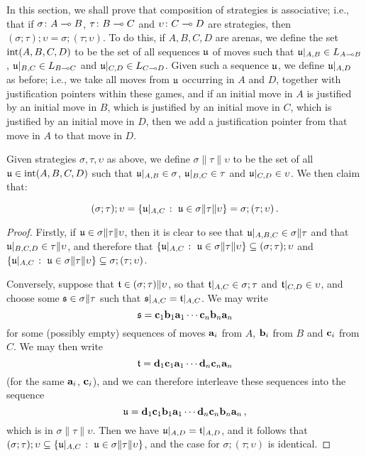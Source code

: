 \documentclass[11pt]{report}
\begin{document}
In this section, we shall prove that composition of strategies is associative; i.e., that if $\sigma\colon A \multimap B$, $\tau\colon B\multimap C$ and $\upsilon \colon C \multimap D$ are strategies, then $(\sigma;\tau);\upsilon=\sigma;(\tau;\upsilon)$.  
To do this, if $A,B,C,D$ are arenas, we define the set $\operatorname{int}(A,B,C,D)$ to be the set of all sequences $\mathfrak u$ of moves such that $\mathfrak u\vert_{A,B}\in L_{A\multimap B}$, $\mathfrak u\vert_{B,C}\in L_{B\multimap C}$ and $\mathfrak u\vert_{C,D}\in L_{C \multimap D}$.  
Given such a sequence $\mathfrak u$, we define $\mathfrak u\vert_{A,D}$ as before; i.e., we take all moves from $\mathfrak u$ occurring in $A$ and $D$, together with justification pointers within these games, and if an initial move in $A$ is justified by an initial move in $B$, which is justified by an initial move in $C$, which is justified by an initial move in $D$, then we add a justification pointer from that move in $A$ to that move in $D$.

Given strategies $\sigma,\tau,\upsilon$ as above, we define $\sigma\|\tau\|\upsilon$ to be the set of all $\mathfrak u\in\operatorname{int}(A,B,C,D)$ such that $\mathfrak u\vert_{A,B}\in\sigma$, $\mathfrak u\vert_{B,C}\in\tau$ and $\mathfrak u\vert_{C,D}\in\upsilon$.
We then claim that:

\begin{lemma}
  \[
    (\sigma;\tau);\upsilon = \{\mathfrak u\vert_{A,C}\;\colon\; \mathfrak u\in\sigma\|\tau\|\upsilon\} = \sigma;(\tau;\upsilon)\,.
    \]
\end{lemma}
\begin{proof}
  Firstly, if $\mathfrak u\in\sigma\|\tau\|\upsilon$, then it is clear to see that $\mathfrak u\vert_{A,B,C}\in\sigma\|\tau$ and that $\mathfrak u\vert_{B,C,D}\in\tau\|\upsilon$, and therefore that $\{\mathfrak u\vert_{A,C}\;\colon\; \mathfrak u\in\sigma\|\tau\|\upsilon\}\subseteq (\sigma;\tau);\upsilon$ and $\{\mathfrak u\vert_{A,C}\;\colon\; \mathfrak u\in\sigma\|\tau\|\upsilon\}\subseteq \sigma;(\tau;\upsilon)$. 

  Conversely, suppose that $\mathfrak t\in(\sigma;\tau)\|\upsilon$, so that $\mathfrak t\vert_{A,C}\in\sigma;\tau$ and $\mathfrak t\vert_{C,D}\in\upsilon$, and choose some $\mathfrak s\in\sigma\|\tau$ such that $\mathfrak s\vert_{A,C}=\mathfrak t\vert_{A,C}$.
  We may write 
  \[
    \mathfrak s=\mathbf{c}_1\mathbf{b}_1\mathbf{a}_1\cdots \mathbf{c}_n\mathbf{b}_n\mathbf{a}_n
    \]
  for some (possibly empty) sequences of moves $\mathbf{a}_i$ from $A$, $\mathbf{b}_i$ from $B$ and $\mathbf{c}_i$ from $C$.  
  We may then write 
  \[
    \mathfrak t=\mathbf{d}_1\mathbf{c}_1\mathbf{a}_1\cdots\mathbf{d}_n\mathbf{c}_n\mathbf{a}_n
    \]
  (for the same $\mathbf{a}_i$, $\mathbf{c}_i$), and we can therefore interleave these sequences into the sequence
  \[
    \mathfrak u = \mathbf{d}_1\mathbf{c}_1\mathbf{b}_1\mathbf{a}_1\cdots\mathbf{d}_n\mathbf{c}_n\mathbf{b}_n\mathbf{a}_n\,,
    \]
  which is in $\sigma\|\tau\|\upsilon$.
  Then we have $\mathfrak u\vert_{A,D}=\mathfrak t\vert_{A,D}$, and it follows that $(\sigma;\tau);\upsilon\subseteq\{\mathfrak u\vert_{A,C}\;\colon\; \mathfrak u\in\sigma\|\tau\|\upsilon\}$, and the case for $\sigma;(\tau;\upsilon)$ is identical.
\end{proof}
\end{document}
